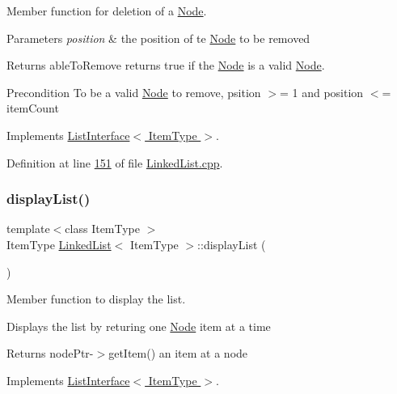 Member function for deletion of a \hyperlink{classNode}{Node}. 


\begin{DoxyParams}{Parameters}
{\em position} & the position of te \hyperlink{classNode}{Node} to be removed \\
\hline
\end{DoxyParams}
\begin{DoxyReturn}{Returns}
able\+To\+Remove returns true if the \hyperlink{classNode}{Node} is a valid \hyperlink{classNode}{Node}. 
\end{DoxyReturn}
\begin{DoxyPrecond}{Precondition}
To be a valid \hyperlink{classNode}{Node} to remove, psition $>$= 1 and position $<$= item\+Count 
\end{DoxyPrecond}


Implements \hyperlink{classListInterface_a68520ce2942ec716c745b1137c50a3c6}{List\+Interface$<$ Item\+Type $>$}.



Definition at line \hyperlink{LinkedList_8cpp_source_l00151}{151} of file \hyperlink{LinkedList_8cpp_source}{Linked\+List.\+cpp}.

\mbox{\label{classLinkedList_a65fb58d9f9b8af41e9569d1dc3200583}} 
\subsubsection{\texorpdfstring{display\+List()}{displayList()}}
{\footnotesize\ttfamily template$<$class Item\+Type $>$ \\
Item\+Type \hyperlink{classLinkedList}{Linked\+List}$<$ Item\+Type $>$\+::display\+List (\begin{DoxyParamCaption}{ }\end{DoxyParamCaption})\hspace{0.3cm}{\ttfamily [virtual]}}



Member function to display the list. 

Displays the list by returing one \hyperlink{classNode}{Node} item at a time \begin{DoxyReturn}{Returns}
node\+Ptr-\/$>$get\+Item() an item at a node 
\end{DoxyReturn}


Implements \hyperlink{classListInterface_a2f2f533e962dd89111ee50b972dc28e7}{List\+Interface$<$ Item\+Type $>$}.



